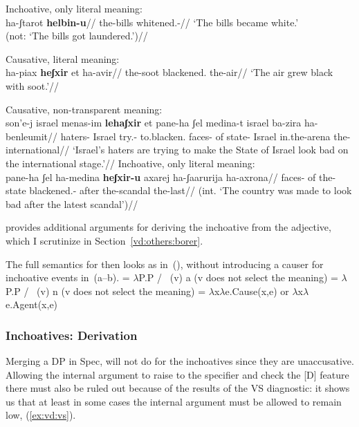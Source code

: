 	\a Inchoative, only literal meaning:\\
		\begingl
			\gla ha-ʃtarot \textbf{helbin-u}//
			\glb the-bills whitened.-//
			\glft `The bills became white.'\\
				(not: `The bills got laundered.')//
		\endgl
\xe

\pex
	\a Causative, literal meaning:\\
		\begingl
			\gla ha-piax \textbf{heʃxir} et ha-avir//
			\glb the-soot blackened.  the-air//
			\glft `The air grew black with soot.'//
		\endgl
	
	\a Causative, non-transparent meaning:\\
		\begingl
			\gla son'e-j israel menas-im \textbf{lehaʃxir} et pane-ha ʃel medina-t israel ba-zira ha-benleumit//
			\glb haters- Israel try.- to.blacken.  faces- of state- Israel in.the-arena the-international//
			\glft `Israel's haters are trying to make the State of Israel look bad on the international stage.'//
		\endgl
	\a Inchoative, only literal meaning:\\
		\begingl
			\gla{}pane-ha ʃel ha-medina \textbf{heʃxir-u} axarej ha-ʃaarurija ha-axrona//
			\glb faces- of the-state blackened.- after the-scandal the-last//
			\glft (int. `The country was made to look bad after the latest scandal')//
		\endgl
\xe


\cite{borer91} provides additional arguments for deriving the inchoative from the adjective, which I scrutinize in Section~\ref{vd:others:borer}.

The full semantics for {\vd} then looks as in~(\nextx), without introducing a causer for inchoative events in~(\nextx a--b).
\pex\label{ex:vd:sem-full}
	\a \denote{\vd} = $\lambda$P.P / \trace~(v) a \hfill (v does not select the meaning)
	\a \denote{\vd} = $\lambda$P.P / \trace~(v) n \hfill (v does not select the meaning)
	\a \denote{\vd} = $\lambda$x$\lambda$e.Cause(x,e) or $\lambda$x$\lambda$e.Agent(x,e)
\xe

		\subsubsection{Inchoatives: Derivation}
Merging a DP in Spec,{\vd} will not do for the inchoatives since they are unaccusative. Allowing the internal argument to raise to the specifier and check the [D] feature there must also be ruled out because of the results of the VS diagnostic: it shows us that at least in some cases the internal argument must be allowed to remain low, (\ref{ex:vd:vs}).

